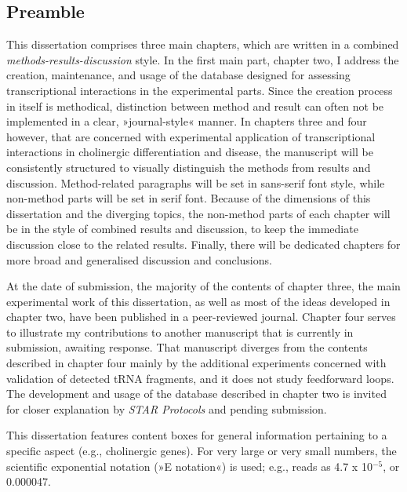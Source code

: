 
\begin{spacing}{\dnormalspacing}

\chapter*{Preamble}
\noindent
This dissertation comprises three main chapters, which are written in a combined \emph{methods-results-discussion} style. In the first main part, chapter two, I address the creation, maintenance, and usage of the database designed for assessing transcriptional interactions in the experimental parts. Since the creation process in itself is methodical, distinction between method and result can often not be implemented in a clear, »journal-style« manner. In chapters three and four however, that are concerned with experimental application of transcriptional interactions in cholinergic differentiation and disease, the manuscript will be consistently structured to visually distinguish the methods from results and discussion. Method-related paragraphs will be set in sans-serif font style, while non-method parts will be set in serif font. Because of the dimensions of this dissertation and the diverging topics, the non-method parts of each chapter will be in the style of combined results and discussion, to keep the immediate discussion close to the related results. Finally, there will be dedicated chapters for more broad and generalised discussion and conclusions.

At the date of submission, the majority of the contents of chapter three, the main experimental work of this dissertation, as well as most of the ideas developed in chapter two, have been published in a peer-reviewed journal.\cite{Lobentanzer2019a} Chapter four serves to illustrate my contributions to another manuscript that is currently in submission, awaiting response.\cite{Winek2020} That manuscript diverges from the contents described in chapter four mainly by the additional experiments concerned with validation of detected tRNA fragments, and it does not study feedforward loops. The development and usage of the database described in chapter two is invited for closer explanation by \emph{STAR Protocols} and pending submission.\cite{Lobentanzer2020}

This dissertation features content boxes for general information pertaining to a specific aspect (e.g., cholinergic genes). For very large or very small numbers, the scientific exponential notation (»E notation«) is used; e.g.,  reads as 4.7 x 10$^{-5}$, or 0.000047.


\end{spacing}
